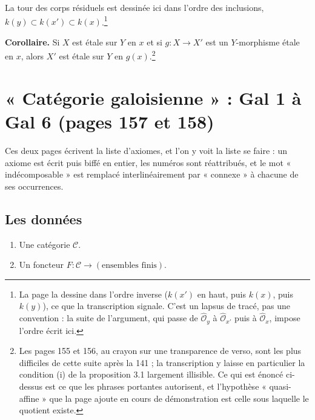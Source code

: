 \documentclass[11pt,a4paper]{article}
\begin{document}
\qquad
{}

La tour des corps résiduels est dessinée ici dans l'ordre des inclusions,
$k(y) \subset k(x') \subset k(x)$.\footnote{La page la dessine dans l'ordre
inverse ($k(x')$ en haut, puis $k(x)$, puis $k(y)$), ce que la
transcription signale. C'est un lapsus de tracé, pas une convention : la
suite de l'argument, qui passe de $\hat{\mathcal{O}}_{y}$ à
$\hat{\mathcal{O}}_{x'}$ puis à $\hat{\mathcal{O}}_{x}$, impose l'ordre écrit
ici.}

\textbf{Corollaire.} Si $X$ est étale sur $Y$ en $x$ et si $g : X \to X'$ est
un $Y$-morphisme étale en $x$, alors $X'$ est étale sur $Y$ en
$g(x)$.\footnote{Les pages 155 et 156, au crayon sur une transparence de
verso, sont les plus difficiles de cette suite après la 141 ; la transcription y laisse
en particulier la condition (i) de la proposition 3.1 largement illisible. Ce
qui est énoncé ci-dessus est ce que les phrases portantes autorisent, et
l'hypothèse « quasi-affine » que la page ajoute en cours de démonstration est
celle sous laquelle le quotient existe.}

\section*{« Catégorie galoisienne » : Gal 1 à Gal 6 (pages 157 et 158)}

Ces deux pages écrivent la liste
d'axiomes, et l'on y voit la liste se faire : un axiome est écrit puis biffé en
entier, les numéros sont réattribués, et le mot « indécomposable » est remplacé
interlinéairement par « connexe » à chacune de ses occurrences.

\subsection*{Les données}

\begin{enumerate}
  \item[(i)] Une catégorie $\mathcal{C}$.
  \item[(ii)] Un foncteur $F : \mathcal{C} \to (\text{ensembles finis})$.
\end{enumerate}
\end{document}
